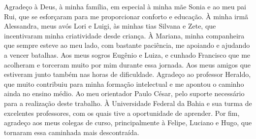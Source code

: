 
\begin{agradecimentos}[AGRADECIMENTOS]

Agradeço à Deus, à minha família, em especial à minha mãe Sonia e ao meu pai Rui, que se esforçaram para me proporcionar conforto e educação. À minha irmã Alessandra, meus avós Lori e Luigi, às minhas tias Silvana e Zete, que incentivaram minha criatividade desde criança. À Mariana, minha companheira que sempre esteve ao meu lado, com bastante paciência, me apoiando e ajudando a vencer batalhas. Aos meus sogros Eugênio e Luiza, e cunhado Francisco que me acolheram e torceram muito por mim durante essa jornada. Aos meus amigos que estiveram junto também nas horas de dificuldade. Agradeço ao professor Heraldo, que muito contribuiu para minha formação intelectual e me apontou o caminho ainda no ensino médio. Ao meu orientador Paulo César, pelo suporte necessário para a realização deste trabalho. À Universidade Federal da Bahia e sua turma de excelentes professores, com os quais tive a oportunidade de aprender. Por fim, agradeço aos meus colegas de curso, principalmente à Felipe, Luciano e Hugo, que tornaram essa caminhada mais descontraída.

\end{agradecimentos}
